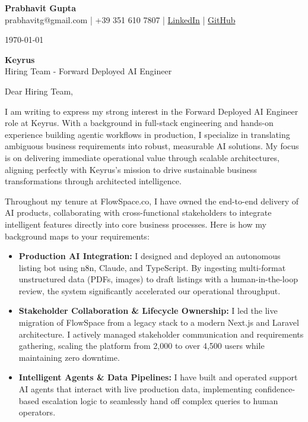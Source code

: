 \documentclass[11pt,a4paper]{article}
\begin{document}
\begin{center}
    {\Huge \textbf{Prabhavit Gupta}} \\
    \vspace{2mm}
    prabhavitg@gmail.com | +39 351 610 7807 | \href{https://www.linkedin.com/in/prabhavit/}{LinkedIn} | \href{https://github.com/prab-gupta}{GitHub}
\end{center}

\vspace{8mm}
\today

\vspace{4mm}
\textbf{Keyrus} \\
Hiring Team - Forward Deployed AI Engineer

\vspace{4mm}
Dear Hiring Team,

I am writing to express my strong interest in the Forward Deployed AI Engineer role at Keyrus. With a background in full-stack engineering and hands-on experience building agentic workflows in production, I specialize in translating ambiguous business requirements into robust, measurable AI solutions. My focus is on delivering immediate operational value through scalable architectures, aligning perfectly with Keyrus's mission to drive sustainable business transformations through architected intelligence.

Throughout my tenure at FlowSpace.co, I have owned the end-to-end delivery of AI products, collaborating with cross-functional stakeholders to integrate intelligent features directly into core business processes. Here is how my background maps to your requirements:

\begin{itemize}
    \item \textbf{Production AI Integration:} I designed and deployed an autonomous listing bot using n8n, Claude, and TypeScript. By ingesting multi-format unstructured data (PDFs, images) to draft listings with a human-in-the-loop review, the system significantly accelerated our operational throughput.
    \item \textbf{Stakeholder Collaboration \& Lifecycle Ownership:} I led the live migration of FlowSpace from a legacy stack to a modern Next.js and Laravel architecture. I actively managed stakeholder communication and requirements gathering, scaling the platform from 2,000 to over 4,500 users while maintaining zero downtime.
    \item \textbf{Intelligent Agents \& Data Pipelines:} I have built and operated support AI agents that interact with live production data, implementing confidence-based escalation logic to seamlessly hand off complex queries to human operators. 
\end{itemize}
\end{document}
